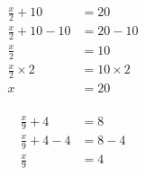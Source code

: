 \documentclass[12pt]{article}
\newcounter{minipagecount}
\begin{document}
\begin{multicols}{2}
\begin{minipage}[t]{0.45\textwidth}
\begin{align*}
    \end{align*}
\end{minipage} %
\noindent{(\theminipagecount)}\hspace{0.1mm} %
\begin{minipage}[t]{0.45\textwidth} %
    \vspace{-26pt}  %
    \raggedright %
    \begin{align*} %
        \frac{x}{2} + 10 &= 20\\
        \frac{x}{2} + 10 - 10 &= 20 - 10\\
        \frac{x}{2} &= 10\\
        \frac{x}{2} \times2 &= 10 \times2\\
        x &= 20\\
    \end{align*}
\end{minipage} %
\noindent{(\theminipagecount)}\hspace{0.1mm} %
\begin{minipage}[t]{0.45\textwidth} %
    \vspace{-26pt}  %
    \raggedright %
    \begin{align*} %
        \frac{x}{9} + 4 &= 8\\
        \frac{x}{9} + 4 - 4 &= 8 - 4\\
        \frac{x}{9} &= 4\\

\end{align*}
\end{minipage}
\end{multicols}
\end{document}

